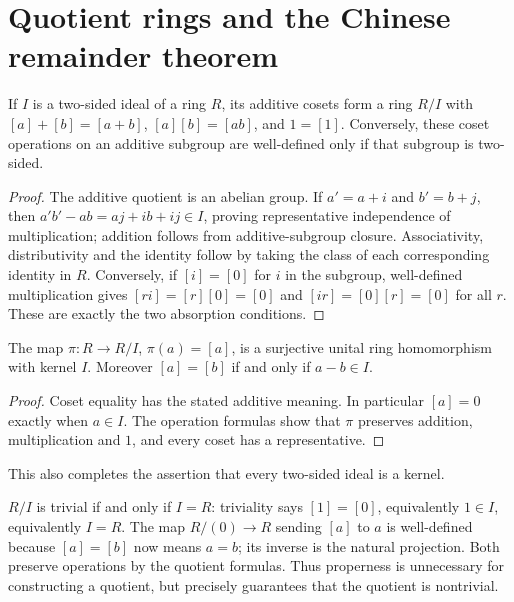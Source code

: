 \chapter{Quotient rings and the Chinese remainder theorem}\label{chap:M07.09}

\begin{theorem}\label{thm:quotient-ring-construction}
If $I$ is a two-sided ideal of a ring $R$, its additive cosets form a
ring $R/I$ with $[a]+[b]=[a+b]$, $[a][b]=[ab]$, and $1=[1]$.
Conversely, these coset operations on an additive subgroup are
well-defined only if that subgroup is two-sided.
\end{theorem}
\begin{proof}
The additive quotient is an abelian group. If $a'=a+i$ and $b'=b+j$,
then $a'b'-ab=aj+ib+ij\in I$, proving representative independence of
multiplication; addition follows from additive-subgroup closure.
Associativity, distributivity and the identity follow by taking the
class of each corresponding identity in $R$. Conversely, if $[i]=[0]$
for $i$ in the subgroup, well-defined multiplication gives
$[ri]=[r][0]=[0]$ and $[ir]=[0][r]=[0]$ for all $r$. These are exactly
the two absorption conditions.
\end{proof}

\begin{proposition}\label{prop:quotient-projection}
The map $\pi:R\to R/I$, $\pi(a)=[a]$, is a surjective unital ring
homomorphism with kernel $I$. Moreover
$[a]=[b]$ if and only if $a-b\in I$.
\end{proposition}
\begin{proof}
Coset equality has the stated additive meaning. In particular $[a]=0$
exactly when $a\in I$. The operation formulas show that $\pi$ preserves
addition, multiplication and $1$, and every coset has a representative.
\end{proof}
This also completes the assertion that every two-sided ideal is a kernel.

$R/I$ is trivial if and only if $I=R$: triviality says $[1]=[0]$,
equivalently $1\in I$, equivalently $I=R$.
The map $R/(0)\to R$ sending $[a]$ to $a$ is well-defined because
$[a]=[b]$ now means $a=b$; its inverse is the natural projection.
Both preserve operations by the quotient formulas. Thus properness is
unnecessary for constructing a quotient, but precisely guarantees that
the quotient is nontrivial.

